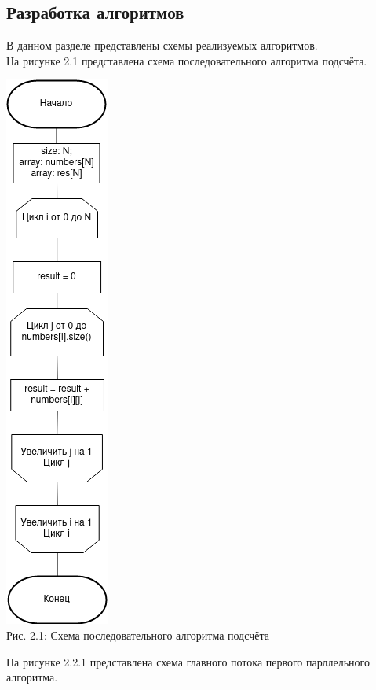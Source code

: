 \documentclass[12pt,a4paper]{article}
\numberwithin{equation}{section}
\begin{document}
\subsection{Разработка алгоритмов} %
В данном разделе представлены схемы реализуемых алгоритмов.\\
На рисунке 2.1 представлена схема последовательного алгоритма подсчёта.\\
\begin{center}	
	\includegraphics[width=.2\linewidth]{src/schemas/consistent.png}\\
	Рис. 2.1: Схема последовательного алгоритма подсчёта
\end{center}
\clearpage
На рисунке 2.2.1 представлена схема главного потока первого парллельного алгоритма.\\
\end{document}
